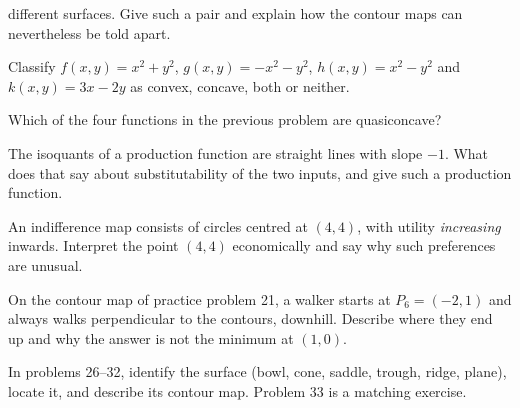 \begin{problems}
        different surfaces. Give such a pair and explain how the contour
        maps can nevertheless be told apart.
  \item Classify $f(x,y)=x^{2}+y^{2}$, $g(x,y)=-x^{2}-y^{2}$,
        $h(x,y)=x^{2}-y^{2}$ and $k(x,y)=3x-2y$ as convex, concave, both or
        neither.
  \item Which of the four functions in the previous problem are
        quasiconcave?
  \item The isoquants of a production function are straight lines with
        slope $-1$. What does that say about substitutability of the two
        inputs, and give such a production function.
  \item An indifference map consists of circles centred at $(4,4)$, with
        utility \emph{increasing} inwards. Interpret the point $(4,4)$
        economically and say why such preferences are unusual.
  \item On the contour map of practice problem 21, a walker starts at $P_{6}=(-2,1)$
        and always walks perpendicular to the contours, downhill. Describe
        where they end up and why the answer is not the minimum at
        $(1,0)$.
\end{problems}

In problems 26--32, identify the surface (bowl, cone, saddle, trough,
ridge, plane), locate it, and describe its contour map. Problem 33 is a
matching exercise.


